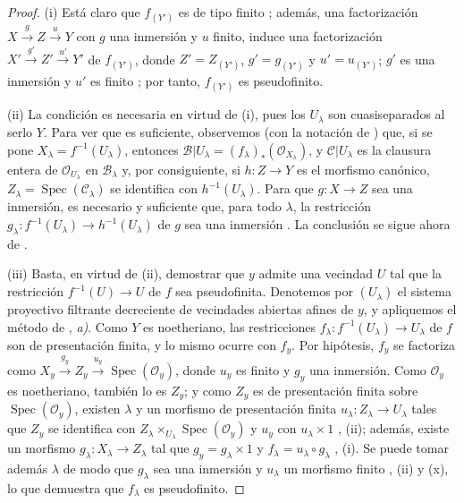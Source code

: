 \begin{proof}
(i) Está claro que $f_{(Y')}$ es de tipo finito ; además, una factorización $X\xrightarrow{g}Z\xrightarrow{u}Y$ con $g$ una inmersión y $u$ finito, induce una factorización $X'\xrightarrow{g'}Z'\xrightarrow{u'}Y'$ de $f_{(Y')}$, donde $Z'=Z_{(Y')}$, $g'=g_{(Y')}$ y $u'=u_{(Y')}$; $g'$ es una inmersión  y $u'$ es finito ; por tanto, $f_{(Y')}$ es pseudofinito.

(ii) La condición es necesaria en virtud de (i), pues los $U_\lambda$ son cuasiseparados al serlo $Y$.
Para ver que es suficiente, observemos (con la notación de ) que, si se pone $X_\lambda=f^{-1}(U_\lambda)$, entonces $\mathcal B|U_\lambda=(f_\lambda)_*(\mathcal O_{X_\lambda})$, y $\mathcal C|U_\lambda$ es la clausura entera de $\mathcal O_{U_\lambda}$ en $\mathcal B_\lambda$ y, por consiguiente, si $h:Z\to Y$ es el morfismo canónico, $Z_\lambda=\operatorname{Spec}(\mathcal C_\lambda)$ se identifica con $h^{-1}(U_\lambda)$. Para que $g:X\to Z$ sea una inmersión, es necesario y suficiente que, para todo $\lambda$, la restricción $g_\lambda:f^{-1}(U_\lambda)\to h^{-1}(U_\lambda)$ de $g$ sea una inmersión . La conclusión se sigue ahora de .

(iii) Basta, en virtud de (ii), demostrar que $y$ admite una vecindad $U$ tal que la restricción $f^{-1}(U)\to U$ de $f$ sea pseudofinita.
Denotemos por $(U_\lambda)$ el sistema proyectivo filtrante decreciente de vecindades abiertas afines de $y$, y apliquemos el método de , \emph{a)}.
Como $Y$ es noetheriano, las restricciones $f_\lambda:f^{-1}(U_\lambda)\to U_\lambda$ de $f$ son de presentación finita, y lo mismo ocurre con $f_y$.
Por hipótesis, $f_y$ se factoriza como $X_y\xrightarrow{g_y}Z_y\xrightarrow{u_y}\operatorname{Spec}(\mathcal O_y)$, donde $u_y$ es finito y $g_y$ una inmersión.
Como $\mathcal O_y$ es noetheriano, también lo es $Z_y$; y como $Z_y$ es de presentación finita sobre $\operatorname{Spec}(\mathcal O_y)$, existen $\lambda$ y un morfismo de presentación finita $u_\lambda:Z_\lambda\to U_\lambda$ tales que $Z_y$ se identifica con $Z_\lambda\times_{U_\lambda}\operatorname{Spec}(\mathcal O_y)$ y $u_y$ con $u_\lambda\times 1$ , (ii); además, existe un morfismo $g_\lambda:X_\lambda\to Z_\lambda$ tal que $g_y=g_\lambda\times 1$ y $f_\lambda=u_\lambda\circ g_\lambda$ , (i). Se puede tomar además $\lambda$ de modo que $g_\lambda$ sea una inmersión y $u_\lambda$ un morfismo finito , (ii) y (x), lo que demuestra que $f_\lambda$ es pseudofinito.
\end{proof}

